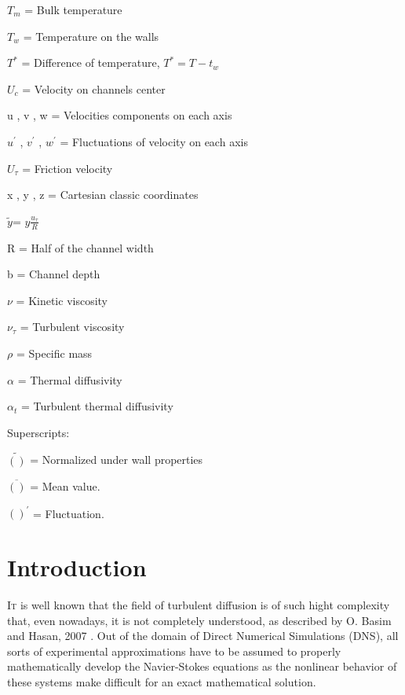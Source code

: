 \documentclass[10pt]{article} %
\begin{document}
	
	
	
	$T_m$ = Bulk temperature 
	
	
	
	
	$T_w$ = Temperature on the walls
	
	
	
	
	$T^\ast$ = Difference of temperature, $T^\ast = T - t_w $ 
	
	
	
	
	${U}_c$ = Velocity on channels center
	
	
	
	u , v , w = Velocities components on each axis
	
	
	$u^\prime $ , $ v^\prime $ , $ w^\prime $ = Fluctuations of velocity on each axis
	
	
	$U_\tau$ = Friction velocity
	
	
	x , y , z = Cartesian classic coordinates
	
	
	$\tilde{y} $= $ y \frac{u_\tau}{R} $
	
	
	R = Half of the channel width
	
	
	
	b = Channel depth
	
	
	
	$\nu$ = Kinetic viscosity
	
	
	$\nu_\tau$ = Turbulent viscosity
	
	
	$\rho$ = Specific mass
	
	
	$\alpha$ = Thermal diffusivity
	
	
	$\alpha_t$ = Turbulent thermal diffusivity 
	
	\vspace{8.00mm}
	
	\begin{LARGE}
		Superscripts: 
	\end{LARGE} 
	
	$\tilde{()}$ = Normalized under wall properties
	
	$\overline{()}$ = Mean value.
	 
	$()^\prime$ = Fluctuation. 


\section{Introduction}

\lettrine[nindent=0em,lines=2]{I}t is well known that the field of turbulent diffusion is of such hight complexity that, even nowadays, it is not completely understood, as described by O. Basim and Hasan, 2007 \cite{hasan}. Out of the domain of Direct Numerical Simulations (DNS), all sorts of experimental approximations have to be assumed to properly mathematically develop the Navier-Stokes equations as the nonlinear behavior of these systems \cite{John} make difficult for an exact mathematical solution. 
\end{document}
